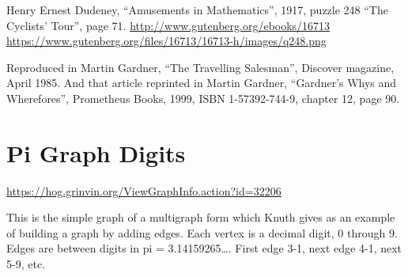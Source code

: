 \documentclass{article}
\begin{document}
Henry Ernest Dudeney, ``Amusements in Mathematics'', 1917, puzzle 248
``The Cyclists' Tour'', page 71.\newline
\url{http://www.gutenberg.org/ebooks/16713}\newline
\url{https://www.gutenberg.org/files/16713/16713-h/images/q248.png}

Reproduced in Martin Gardner, ``The Travelling Salesman'', Discover
magazine, April 1985.  And that article reprinted in Martin Gardner,
``Gardner's Whys and Wherefores'', Prometheus Books, 1999, ISBN
1-57392-744-9, chapter 12, page 90.

\begin{center}
\end{center}


\section{Pi Graph Digits}

\url{https://hog.grinvin.org/ViewGraphInfo.action?id=32206}

\smallskip

This is the simple graph of a multigraph form which Knuth gives as an
example of building a graph by adding edges.  Each vertex is a decimal
digit, 0 through 9.  Edges are between digits in pi = 3.14159265\dots.
First edge 3-1, next edge 4-1, next 5-9, etc.
\end{document}
